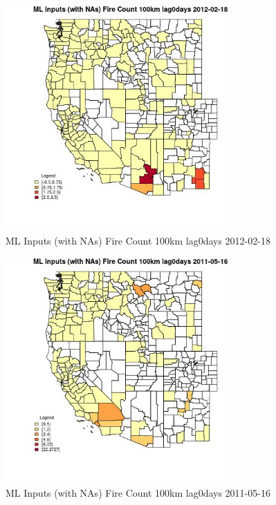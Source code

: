 \begin{figure} 
\centering  
\includegraphics[width=0.77\textwidth]{Code_Outputs/Report_ML_input_PM25_Step4_part_f_de_duplicated_aveswNAs_CountyFire_Count_100km_lag0daysMean2012-02-18.jpg} 
\caption{\label{fig:Report_ML_input_PM25_Step4_part_f_de_duplicated_aveswNAsCountyFire_Count_100km_lag0daysMean2012-02-18}ML Inputs (with NAs) Fire Count 100km lag0days 2012-02-18} 
\end{figure} 
 

\begin{figure} 
\centering  
\includegraphics[width=0.77\textwidth]{Code_Outputs/Report_ML_input_PM25_Step4_part_f_de_duplicated_aveswNAs_CountyFire_Count_100km_lag0daysMean2011-05-16.jpg} 
\caption{\label{fig:Report_ML_input_PM25_Step4_part_f_de_duplicated_aveswNAsCountyFire_Count_100km_lag0daysMean2011-05-16}ML Inputs (with NAs) Fire Count 100km lag0days 2011-05-16} 
\end{figure} 
 

